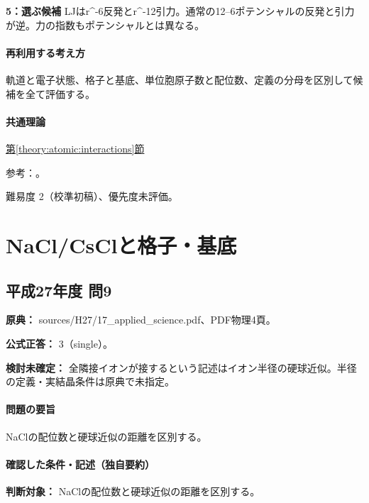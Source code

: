 \noindent\textbf{5：選ぶ候補} LJはr\textasciicircum{}-6反発とr\textasciicircum{}-12引力。通常の12–6ポテンシャルの反発と引力が逆。力の指数もポテンシャルとは異なる。\par

\paragraph{再利用する考え方} 軌道と電子状態、格子と基底、単位胞原子数と配位数、定義の分母を区別して候補を全て評価する。

\paragraph{共通理論} \hyperref[theory:atomic:interactions]{第\ref*{theory:atomic:interactions}節}

\par 参考：\cite{atomic_lj,atomic_nonbond}。

\par 難易度 2（校準初稿）、優先度未評価。

\section{NaCl/CsClと格子・基底}

\subsection{平成27年度 問9}
\label{q:h27-reg-applied-09}

\noindent\textbf{原典：} sources/H27/17\_applied\_science.pdf、PDF物理4頁。

\textbf{公式正答：} 3（single）。

\par\textbf{検討未確定：} 全隣接イオンが接するという記述はイオン半径の硬球近似。半径の定義・実結晶条件は原典で未指定。

\paragraph{問題の要旨} NaClの配位数と硬球近似の距離を区別する。

\paragraph{確認した条件・記述（独自要約）}\mbox{}\par

\noindent\textbf{判断対象：} NaClの配位数と硬球近似の距離を区別する。\par

